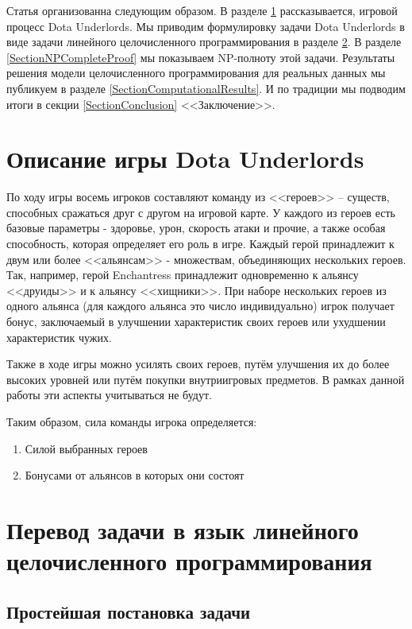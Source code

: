 \documentclass{article}
\begin{document}
Статья организованна следующим образом. В разделе \ref{SectionDUDescription} рассказывается, игровой процесс Dota Underlords. Мы приводим формулировку задачи Dota Underlords в виде задачи линейного целочисленного программирования в разделе \ref{SectionDUIP}. В разделе \ref{SectionNPCompleteProof} мы показываем NP-полноту этой задачи. Результаты решения модели целочисленного программирования для реальных данных мы публикуем в разделе \ref{SectionComputationalResults}. И по традиции мы подводим итоги в секции \ref{SectionConclusion} <<Заключение>>.

\section{Описание игры Dota Underlords}
\label{SectionDUDescription}

По ходу игры восемь игроков составляют команду из <<героев>> – существ, способных сражаться друг с другом на игровой карте. У каждого из героев есть базовые параметры - здоровье, урон, скорость атаки и прочие, а также особая способность, которая определяет его роль в игре. Каждый герой принадлежит к двум или более <<альянсам>> - множествам, объединяющих нескольких героев. Так, например, герой Enchantress принадлежит одновременно к альянсу <<друиды>> и к альянсу <<хищники>>. При наборе нескольких героев из одного альянса (для каждого альянса это число индивидуально) игрок получает бонус, заключаемый в улучшении характеристик своих героев или ухудшении характеристик чужих.

Также в ходе игры можно усилять своих героев, путём улучшения их до более высоких уровней или путём покупки внутриигровых предметов. В рамках данной работы эти аспекты учитываться не будут.

Таким образом, сила команды игрока определяется:

\begin{enumerate}
    \item Силой выбранных героев
    \item Бонусами от альянсов в которых они состоят
\end{enumerate}


\section{Перевод задачи в язык линейного целочисленного программирования }
\label{SectionDUIP}

\subsection{Простейшая постановка задачи}
\end{document}
